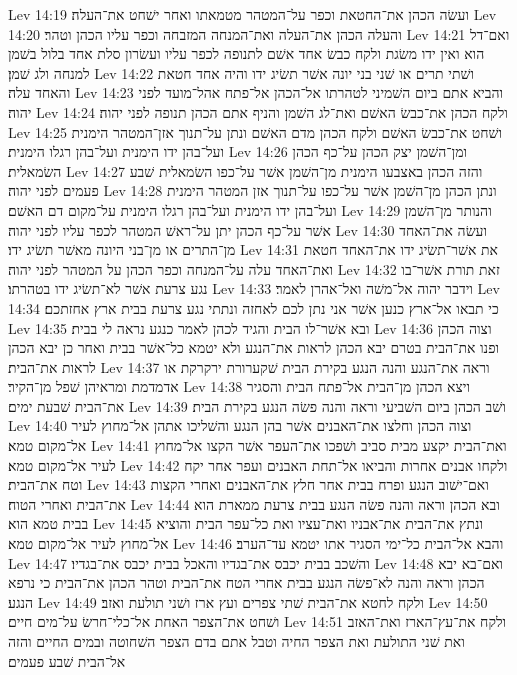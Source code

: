 Lev 14:19  ועשׂה הכהן את־החטאת וכפר על־המטהר מטמאתו ואחר ישׁחט את־העלה׃
Lev 14:20  והעלה הכהן את־העלה ואת־המנחה המזבחה וכפר עליו הכהן וטהר׃
Lev 14:21  ואם־דל הוא ואין ידו משׂגת ולקח כבשׂ אחד אשׁם לתנופה לכפר עליו ועשׂרון סלת אחד בלול בשׁמן למנחה ולג שׁמן׃
Lev 14:22  ושׁתי תרים או שׁני בני יונה אשׁר תשׂיג ידו והיה אחד חטאת והאחד עלה׃
Lev 14:23  והביא אתם ביום השׁמיני לטהרתו אל־הכהן אל־פתח אהל־מועד לפני יהוה׃
Lev 14:24  ולקח הכהן את־כבשׂ האשׁם ואת־לג השׁמן והניף אתם הכהן תנופה לפני יהוה׃
Lev 14:25  ושׁחט את־כבשׂ האשׁם ולקח הכהן מדם האשׁם ונתן על־תנוך אזן־המטהר הימנית ועל־בהן ידו הימנית ועל־בהן רגלו הימנית׃
Lev 14:26  ומן־השׁמן יצק הכהן על־כף הכהן השׂמאלית׃
Lev 14:27  והזה הכהן באצבעו הימנית מן־השׁמן אשׁר על־כפו השׂמאלית שׁבע פעמים לפני יהוה׃
Lev 14:28  ונתן הכהן מן־השׁמן אשׁר על־כפו על־תנוך אזן המטהר הימנית ועל־בהן ידו הימנית ועל־בהן רגלו הימנית על־מקום דם האשׁם׃
Lev 14:29  והנותר מן־השׁמן אשׁר על־כף הכהן יתן על־ראשׁ המטהר לכפר עליו לפני יהוה׃
Lev 14:30  ועשׂה את־האחד מן־התרים או מן־בני היונה מאשׁר תשׂיג ידו׃
Lev 14:31  את אשׁר־תשׂיג ידו את־האחד חטאת ואת־האחד עלה על־המנחה וכפר הכהן על המטהר לפני יהוה׃
Lev 14:32  זאת תורת אשׁר־בו נגע צרעת אשׁר לא־תשׂיג ידו בטהרתו׃
Lev 14:33  וידבר יהוה אל־משׁה ואל־אהרן לאמר׃
Lev 14:34  כי תבאו אל־ארץ כנען אשׁר אני נתן לכם לאחזה ונתתי נגע צרעת בבית ארץ אחזתכם׃
Lev 14:35  ובא אשׁר־לו הבית והגיד לכהן לאמר כנגע נראה לי בבית׃
Lev 14:36  וצוה הכהן ופנו את־הבית בטרם יבא הכהן לראות את־הנגע ולא יטמא כל־אשׁר בבית ואחר כן יבא הכהן לראות את־הבית׃
Lev 14:37  וראה את־הנגע והנה הנגע בקירת הבית שׁקערורת ירקרקת או אדמדמת ומראיהן שׁפל מן־הקיר׃
Lev 14:38  ויצא הכהן מן־הבית אל־פתח הבית והסגיר את־הבית שׁבעת ימים׃
Lev 14:39  ושׁב הכהן ביום השׁביעי וראה והנה פשׂה הנגע בקירת הבית׃
Lev 14:40  וצוה הכהן וחלצו את־האבנים אשׁר בהן הנגע והשׁליכו אתהן אל־מחוץ לעיר אל־מקום טמא׃
Lev 14:41  ואת־הבית יקצע מבית סביב ושׁפכו את־העפר אשׁר הקצו אל־מחוץ לעיר אל־מקום טמא׃
Lev 14:42  ולקחו אבנים אחרות והביאו אל־תחת האבנים ועפר אחר יקח וטח את־הבית׃
Lev 14:43  ואם־ישׁוב הנגע ופרח בבית אחר חלץ את־האבנים ואחרי הקצות את־הבית ואחרי הטוח׃
Lev 14:44  ובא הכהן וראה והנה פשׂה הנגע בבית צרעת ממארת הוא בבית טמא הוא׃
Lev 14:45  ונתץ את־הבית את־אבניו ואת־עציו ואת כל־עפר הבית והוציא אל־מחוץ לעיר אל־מקום טמא׃
Lev 14:46  והבא אל־הבית כל־ימי הסגיר אתו יטמא עד־הערב׃
Lev 14:47  והשׁכב בבית יכבס את־בגדיו והאכל בבית יכבס את־בגדיו׃
Lev 14:48  ואם־בא יבא הכהן וראה והנה לא־פשׂה הנגע בבית אחרי הטח את־הבית וטהר הכהן את־הבית כי נרפא הנגע׃
Lev 14:49  ולקח לחטא את־הבית שׁתי צפרים ועץ ארז ושׁני תולעת ואזב׃
Lev 14:50  ושׁחט את־הצפר האחת אל־כלי־חרשׂ על־מים חיים׃
Lev 14:51  ולקח את־עץ־הארז ואת־האזב ואת שׁני התולעת ואת הצפר החיה וטבל אתם בדם הצפר השׁחוטה ובמים החיים והזה אל־הבית שׁבע פעמים׃
